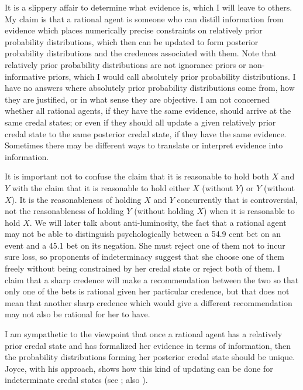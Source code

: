 It is a slippery affair to determine what evidence is, which I will leave to others. My claim is that a rational agent is someone who can distill information from evidence which places numerically precise constraints on relatively prior probability distributions, which then can be updated to form posterior probability distributions and the credences associated with them. Note that relatively prior probability distributions are not ignorance priors or non-informative priors, which I would call absolutely prior probability distributions. I have no answers where absolutely prior probability distributions come from, how they are justified, or in what sense they are objective. I am not concerned whether all rational agents, if they have the same evidence, should arrive at the same credal states; or even if they should all update a given relatively prior credal state to the same posterior credal state, if they have the same evidence. Sometimes there may be different ways to translate or interpret evidence into information.

It is important not to confuse the claim that it is reasonable to hold both $X$ and $Y$ with the claim that it is reasonable to hold either $X$ (without $Y$) or $Y$ (without $X$). It is the reasonableness of holding $X$ and $Y$ concurrently that is controversial, not the reasonableness of holding $Y$ (without holding $X$) when it is reasonable to hold $X$. We will later talk about anti-luminosity, the fact that a rational agent may not be able to distinguish psychologically between a 54.9 cent bet on an event and a 45.1 bet on its negation. She must reject one of them not to incur sure loss, so proponents of indeterminacy suggest that she choose one of them freely without being constrained by her credal state or reject both of them. I claim that a sharp credence will make a recommendation between the two so that only one of the bets is rational given her particular credence, but that does not mean that another sharp credence which would give a different recommendation may not also be rational for her to have.

I am sympathetic to the viewpoint that once a rational agent has a relatively prior credal state and has formalized her evidence in terms of information, then the probability distributions forming her posterior credal state should be unique. Joyce, with his  approach, shows how this kind of updating can be done for indeterminate credal states (see ; also ).

